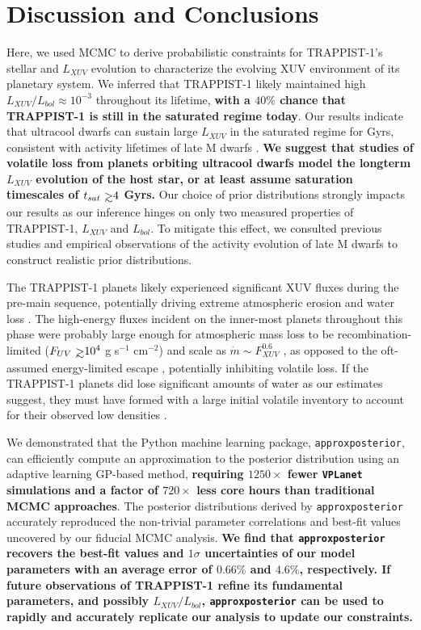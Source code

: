 \documentclass[twocolumn]{aastex62}
\def\gsim{~\rlap{$>$}{\lower 1.0ex\hbox{$\sim$}}}
\newcommand{\xxx}[1]{{\textbf{#1}}}
\newcommand{\vplanet}[0]{\texttt{VPLanet}\xspace}
\newcommand{\approxposterior}[0]{\texttt{approxposterior}\xspace}
\begin{document}

\section{Discussion and Conclusions} \label{sec:discussion}

Here, we used MCMC to derive probabilistic constraints for TRAPPIST-1's stellar and $L_{XUV}$ evolution to characterize the evolving XUV environment of its planetary system. We inferred that TRAPPIST-1 likely maintained high $L_{XUV}/L_{bol} \approx 10^{-3}$ throughout its lifetime, \xxx{with a $40\%$ chance that TRAPPIST-1 is still in the saturated regime today}. Our results indicate that ultracool dwarfs can sustain large $L_{XUV}$ in the saturated regime for Gyrs, consistent with activity lifetimes of late M dwarfs \citep{West2008}. \xxx{We suggest that studies of volatile loss from planets orbiting ultracool dwarfs model the longterm $L_{XUV}$ evolution of the host star, or at least assume saturation timescales of $t_{sat}{\gsim}4$ Gyrs.} Our choice of prior distributions strongly impacts our results as our inference hinges on only two measured properties of TRAPPIST-1, $L_{XUV}$ and $L_{bol}$. To mitigate this effect, we consulted previous studies and empirical observations of the activity evolution of late M dwarfs to construct realistic prior distributions.

The TRAPPIST-1 planets likely experienced significant XUV fluxes during the pre-main sequence, potentially driving extreme atmospheric erosion and water loss \citep{Bolmont2017,Bourrier2017a}. The high-energy fluxes incident on the inner-most planets throughout this phase were probably large enough for atmospheric mass loss to be recombination-limited ($F_{UV} \gsim 10^4$ g s$^{-1}$ cm$^{-2}$) and scale as $\dot{m} \sim F_{XUV}^{0.6}$ \citep{MurrayClay2009}, as opposed to the oft-assumed energy-limited escape \citep[$\dot{m} \sim F_{XUV}$,][]{Watson1981,Lammer2003}, potentially inhibiting volatile loss. If the TRAPPIST-1 planets did lose significant amounts of water as our estimates suggest, they must have formed with a large initial volatile inventory to account for their observed low densities \citep{Grimm2018}.

We demonstrated that the Python machine learning package, \approxposterior \citep{FlemingVanderPlas2018}, can efficiently compute an approximation to the posterior distribution using an adaptive learning GP-based method, \xxx{requiring $1250\times$ fewer \vplanet simulations and a factor of $720\times$ less core hours than traditional MCMC approaches}. The posterior distributions derived by \approxposterior accurately reproduced the non-trivial parameter correlations and best-fit values uncovered by our fiducial MCMC analysis. \xxx{We find that \approxposterior recovers the best-fit values and $1\sigma$ uncertainties of our model parameters with an average error of $0.66\%$ and $4.6\%$, respectively. If future observations of TRAPPIST-1 refine its fundamental parameters, and possibly $L_{XUV}/L_{bol}$, \approxposterior can be used to rapidly and accurately replicate our analysis to update our constraints.}  
\end{document}
